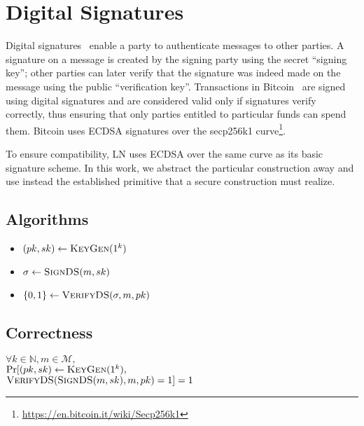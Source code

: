 \section{Digital Signatures}
  Digital signatures~\cite{katzlindell} enable a party to authenticate messages
  to other parties. A signature on a message is created by the signing party
  using the secret ``signing key''; other parties can later verify that the
  signature was indeed made on the message using the public ``verification
  key''. Transactions in Bitcoin~\cite{bitcoin} are signed using digital
  signatures and are considered valid only if signatures verify correctly, thus
  ensuring that only parties entitled to particular funds can spend them.
  Bitcoin uses ECDSA signatures over the secp256k1
  curve\footnote{\url{https://en.bitcoin.it/wiki/Secp256k1}}.

  To ensure compatibility, LN uses ECDSA over the same curve as its basic
  signature scheme. In this work, we abstract the particular construction away
  and use instead the established primitive that a secure construction must
  realize.

  \subsection{Algorithms}
    \begin{itemize}
      \item $(pk, sk) \gets \textsc{KeyGen}(1^k)$
      \item $\sigma \gets \textsc{SignDS}(m, sk)$
      \item $\{0, 1\} \gets \textsc{VerifyDS}(\sigma, m, pk)$
    \end{itemize}

  \subsection{Correctness}
    $\forall k \in \mathbb{N}, m \in \mathcal{M},$ \\
    $\Pr[(pk, sk) \gets \textsc{KeyGen}(1^k),$ \\
    $\textsc{VerifyDS}(\textsc{SignDS}(m, sk), m, pk) = 1] = 1$

